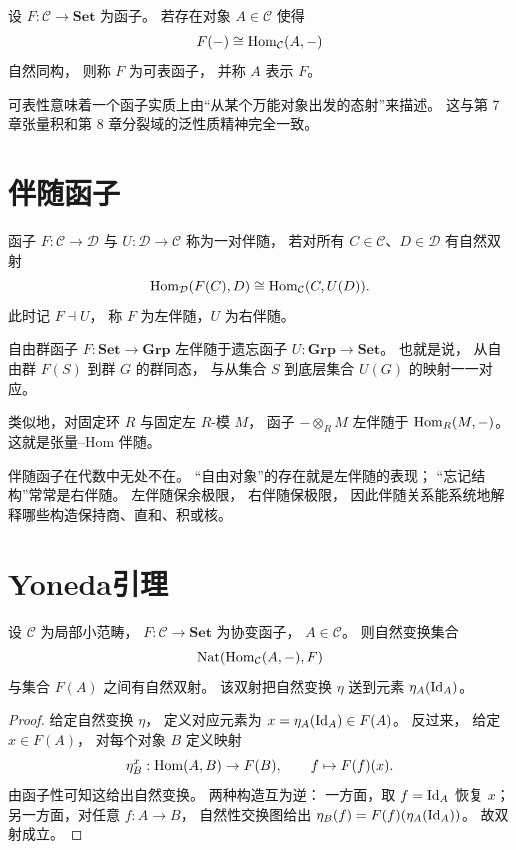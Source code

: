 \begin{definition}
设 $F:\mathcal{C}\to\mathbf{Set}$ 为函子。
若存在对象 $A\in\mathcal{C}$ 使得
\[
F(-)\cong \mathrm{Hom}_{\mathcal{C}}(A,-)
\]
自然同构，
则称 $F$ 为可表函子，
并称 $A$ 表示 $F$。
\end{definition}

可表性意味着一个函子实质上由“从某个万能对象出发的态射”来描述。
这与第 7 章张量积和第 8 章分裂域的泛性质精神完全一致。

\section{伴随函子}

\begin{definition}
函子 $F:\mathcal{C}\to\mathcal{D}$ 与 $U:\mathcal{D}\to\mathcal{C}$ 称为一对伴随，
若对所有 $C\in\mathcal{C}$、$D\in\mathcal{D}$ 有自然双射
\[
\mathrm{Hom}_{\mathcal{D}}(F(C),D)\cong \mathrm{Hom}_{\mathcal{C}}(C,U(D)).
\]
此时记 $F\dashv U$，
称 $F$ 为左伴随，$U$ 为右伴随。
\end{definition}

\begin{example}
自由群函子 $F:\mathbf{Set}\to\mathbf{Grp}$ 左伴随于遗忘函子
$U:\mathbf{Grp}\to\mathbf{Set}$。
也就是说，
从自由群 $F(S)$ 到群 $G$ 的群同态，
与从集合 $S$ 到底层集合 $U(G)$ 的映射一一对应。

类似地，对固定环 $R$ 与固定左 $R$-模 $M$，
函子 $-\otimes_R M$ 左伴随于 $\mathrm{Hom}_R(M,-)$。
这就是张量--Hom 伴随。
\end{example}

伴随函子在代数中无处不在。
“自由对象”的存在就是左伴随的表现；
“忘记结构”常常是右伴随。
左伴随保余极限，
右伴随保极限，
因此伴随关系能系统地解释哪些构造保持商、直和、积或核。

\section{Yoneda引理}

\begin{theorem}[Yoneda 引理]
设 $\mathcal{C}$ 为局部小范畴，
$F:\mathcal{C}\to\mathbf{Set}$ 为协变函子，
$A\in\mathcal{C}$。
则自然变换集合
\[
\mathrm{Nat}(\mathrm{Hom}_{\mathcal{C}}(A,-),F)
\]
与集合 $F(A)$ 之间有自然双射。
该双射把自然变换 $\eta$ 送到元素 $\eta_A(\mathrm{Id}_A)$。
\end{theorem}

\begin{proof}
给定自然变换 $\eta$，
定义对应元素为 $x=\eta_A(\mathrm{Id}_A)\in F(A)$。
反过来，
给定 $x\in F(A)$，
对每个对象 $B$ 定义映射
\[
\eta_B^x:\mathrm{Hom}(A,B)\to F(B),\qquad
f\mapsto F(f)(x).
\]
由函子性可知这给出自然变换。
两种构造互为逆：
一方面，取 $f=\mathrm{Id}_A$ 恢复 $x$；
另一方面，对任意 $f:A\to B$，
自然性交换图给出
$\eta_B(f)=F(f)(\eta_A(\mathrm{Id}_A))$。
故双射成立。
\end{proof}

